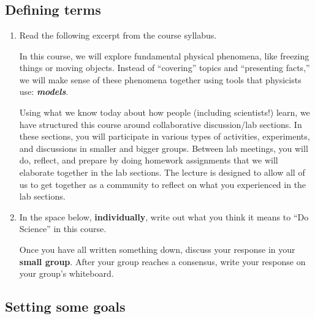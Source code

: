 \chapter{\chapterlongname \thechapter}


\section{Defining terms}

\begin{enumerate}

	\item Read the following excerpt from the course syllabus.
	
	\begin{reading}
			In this course, we will explore fundamental physical phenomena, like freezing things or moving objects. Instead of ``covering'' topics and ``presenting facts,'' we will make sense of these phenomena together using tools that physicists use: \textbf{\em models}.
			
			Using what we know today about how people (including scientists!) learn, we have structured this course around collaborative discussion/lab sections. In these sections, you will participate in various types of activities, experiments, and discussions in smaller and bigger groups. Between lab meetings, you will do, reflect, and prepare by doing homework assignments that we will elaborate together in the lab sections. The lecture is designed to allow all of us to get together as a community to reflect on what you experienced in the lab sections.
	\end{reading}
	
	\item In the space below, \textbf{individually}, write out what you think it means to ``Do Science'' in this course.
	
	\vspace{2in}

Once you have all written something down, discuss your response in your \textbf{small group}. After your group reaches a consensus, write your response on your group's whiteboard.
\end{enumerate}

\WCD
	
\section{Setting some goals}

